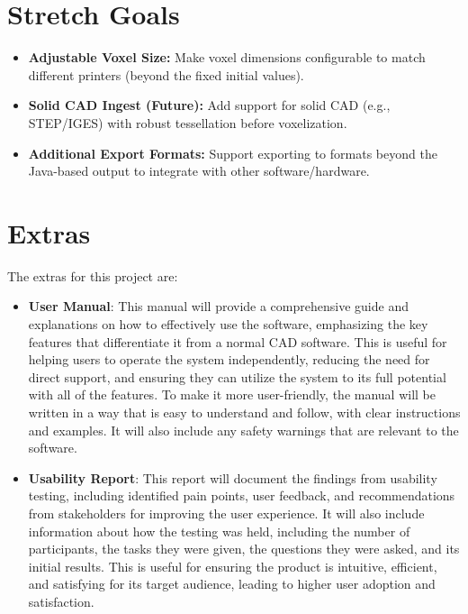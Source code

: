 \documentclass{article}
\begin{document}
\section{Stretch Goals}
\begin{itemize}
  \item \textbf{Adjustable Voxel Size:} Make voxel dimensions configurable to match different printers (beyond the fixed initial values).
  \item \textbf{Solid CAD Ingest (Future):} Add support for solid CAD (e.g., STEP/IGES) with robust tessellation before voxelization.
  \item \textbf{Additional Export Formats:} Support exporting to formats beyond the Java-based output to integrate with other software/hardware.
\end{itemize}

\section{Extras}

The extras for this project are:

\begin{itemize}
    \item \textbf{User Manual}: This manual will provide a comprehensive guide and explanations on how to effectively use the software, emphasizing the key features that differentiate it from a normal CAD software. This is useful for helping users to operate the system independently, reducing the need for direct support, and ensuring they can utilize the system to its full potential with all of the features. To make it more user-friendly, the manual will be written in a way that is easy to understand and follow, with clear instructions and examples. It will also include any safety warnings that are relevant to the software.
    \item \textbf{Usability Report}: This report will document the findings from usability testing, including identified pain points, user feedback, and recommendations from stakeholders for improving the user experience. It will also include information about how the testing was held, including the number of participants, the tasks they were given, the questions they were asked, and its initial results. This is useful for ensuring the product is intuitive, efficient, and satisfying for its target audience, leading to higher user adoption and satisfaction.
\end{itemize}
\newpage{}
\end{document}
